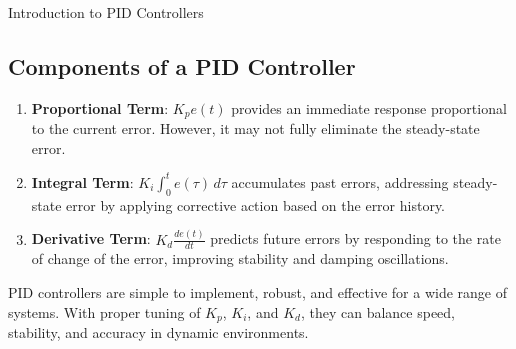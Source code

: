 \documentclass[../main.tex]{subfiles}
\begin{document}
\begin{section}{Introduction to PID Controllers}
	\subsection*{Components of a PID Controller}
	\begin{enumerate}
		\item \textbf{Proportional Term}: \(K_p e(t)\) provides an immediate response proportional to the current error. However, it may not fully eliminate the steady-state error.
		\item \textbf{Integral Term}: \(K_i \int_{0}^{t} e(\tau) \, d\tau\) accumulates past errors, addressing steady-state error by applying corrective action based on the error history.
		\item \textbf{Derivative Term}: \(K_d \frac{d e(t)}{dt}\) predicts future errors by responding to the rate of change of the error, improving stability and damping oscillations.
	\end{enumerate}
	PID controllers are simple to implement, robust, and effective for a wide range of systems. With proper tuning of \(K_p\), \(K_i\), and \(K_d\), they can balance speed, stability, and accuracy in dynamic environments.
	\end{section}
\end{document}
